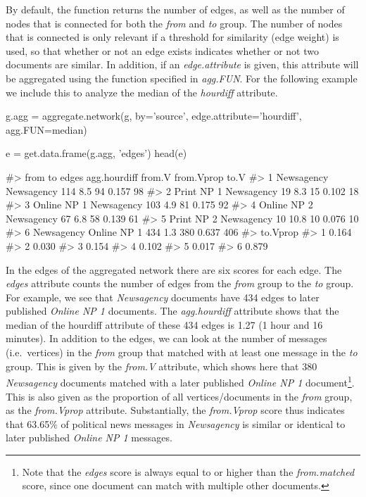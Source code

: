 By default, the function returns the number of edges, as well as the
number of nodes that is connected for both the \emph{from} and \emph{to}
group. The number of nodes that is connected is only relevant if a
threshold for similarity (edge weight) is used, so that whether or not
an edge exists indicates whether or not two documents are similar. In
addition, if an \emph{edge.attribute} is given, this attribute will be
aggregated using the function specified in \emph{agg.FUN}. For the
following example we include this to analyze the median of the
\emph{hourdiff} attribute.

\begin{Schunk}
\begin{Sinput}
g.agg = aggregate.network(g, by='source', edge.attribute='hourdiff', agg.FUN=median)

e = get.data.frame(g.agg, 'edges')
head(e)
\end{Sinput}
\begin{Soutput}
#>          from          to edges agg.hourdiff from.V from.Vprop to.V
#> 1  Newsagency  Newsagency   114          8.5     94      0.157   98
#> 2  Print NP 1  Newsagency    19          8.3     15      0.102   18
#> 3 Online NP 1  Newsagency   103          4.9     81      0.175   92
#> 4 Online NP 2  Newsagency    67          6.8     58      0.139   61
#> 5  Print NP 2  Newsagency    10         10.8     10      0.076   10
#> 6  Newsagency Online NP 1   434          1.3    380      0.637  406
#>   to.Vprop
#> 1    0.164
#> 2    0.030
#> 3    0.154
#> 4    0.102
#> 5    0.017
#> 6    0.879
\end{Soutput}
\end{Schunk}

In the edges of the aggregated network there are six scores for each
edge. The \emph{edges} attribute counts the number of edges from the
\emph{from} group to the \emph{to} group. For example, we see that
\emph{Newsagency} documents have 434 edges to later published
\emph{Online NP 1} documents. The \emph{agg.hourdiff} attribute shows
that the median of the hourdiff attribute of these 434 edges is 1.27 (1
hour and 16 minutes). In addition to the edges, we can look at the
number of messages (i.e.~vertices) in the \emph{from} group that matched
with at least one message in the \emph{to} group. This is given by the
\emph{from.V} attribute, which shows here that 380 \emph{Newsagency}
documents matched with a later published \emph{Online NP 1}
document\footnote{Note that the \emph{edges} score is always equal to or
  higher than the \emph{from.matched} score, since one document can
  match with multiple other documents.}. This is also given as the
proportion of all vertices/documents in the \emph{from} group, as the
\emph{from.Vprop} attribute. Substantially, the \emph{from.Vprop} score
thus indicates that 63.65\% of political news messages in
\emph{Newsagency} is similar or identical to later published
\emph{Online NP 1} messages.

